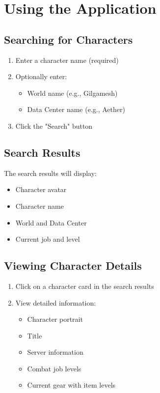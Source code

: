 \documentclass[12pt]{article}
\begin{document}
\section{Using the Application}

\subsection{Searching for Characters}
\begin{enumerate}
    \item Enter a character name (required)
    \item Optionally enter:
    \begin{itemize}
        \item World name (e.g., Gilgamesh)
        \item Data Center name (e.g., Aether)
    \end{itemize}
    \item Click the "Search" button
\end{enumerate}

\subsection{Search Results}
The search results will display:
\begin{itemize}
    \item Character avatar
    \item Character name
    \item World and Data Center
    \item Current job and level
\end{itemize}

\subsection{Viewing Character Details}
\begin{enumerate}
    \item Click on a character card in the search results
    \item View detailed information:
    \begin{itemize}
        \item Character portrait
        \item Title
        \item Server information
        \item Combat job levels
        \item Current gear with item levels
    \end{itemize}
\end{enumerate}
\end{document}

